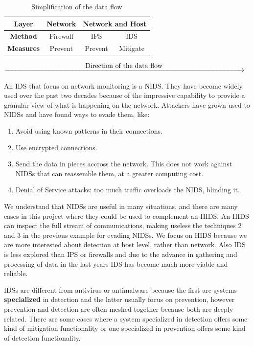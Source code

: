 \begin{table}[H]
	\centering
	\caption{Simplification of the data flow}
\linej
	\begin{tabular}{|c|c|c|c|}
	\hline
		\textbf{Layer} & \textbf{Network} & \multicolumn{2}{c|}{\textbf{Network and Host}}\\ \hline
		\textbf{Method} & Firewall & IPS & IDS\\ \hline
		\textbf{Measures} & Prevent & Prevent & Mitigate\\ \hline
	\end{tabular}
\end{table}
$\xrightarrow{\makebox[\textwidth]{Direction of the data flow}}$

\linej
\linej
An IDS that focus on network monitoring is a NIDS.
They have become widely used over the past two decades because of the impressive capability to provide a granular view of what is happening on the network.
\linej
Attackers have grown used to NIDSs and have found ways to evade them, like\cite{libro_ossec}:
\begin{enumerate}
	\item Avoid using known patterns in their connections.
	\item Use encrypted connections.
	\item Send the data in pieces accross the network. This does not work against NIDSs that can reassemble them, at a greater computing cost. %
	\item Denial of Service attacks: too much traffic overloads the NIDS, blinding it.
\end{enumerate}
\linej
We understand that NIDSs are useful in many situations, and there are many cases in this project where they could be used to complement an HIDS.
An HIDS can inspect the full stream of communications, making useless the techniques 2 and 3 in the previous example for evading NIDSs.
\linej
We focus on HIDS because we are more interested about detection at host level, rather than network.
Also IDS is less explored than IPS or firewalls and due to the advance in gathering and processing of data in the last years IDS has become much more viable and reliable.

\linej
\linej
IDSs are different from antivirus or antimalware because the first are systems \textbf{specialized} in detection and the latter usually focus on prevention, however prevention and detection are often meshed together because both are deeply related. There are some cases where a system specialized in detection offers some kind of mitigation functionality or one specialized in prevention offers some kind of detection functionality.

